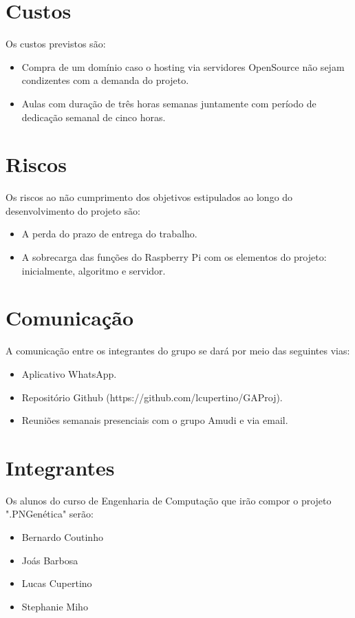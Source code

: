 \documentclass{article}
\begin{document}
	
	\section{Custos}
	Os custos previstos são:
	\begin{itemize}
		\item Compra de um domínio caso o hosting via servidores OpenSource não sejam condizentes com a demanda do projeto.
		\item Aulas com duração de três horas semanas juntamente com período de dedicação semanal de cinco horas.
	\end{itemize}

	
	
	\section{Riscos}
	Os riscos ao não cumprimento dos objetivos estipulados ao longo do desenvolvimento do projeto são: \newline
	\begin{itemize} 
		\item A perda do prazo de entrega do trabalho.
		\item A sobrecarga das funções do Raspberry Pi com os elementos do projeto: inicialmente, algoritmo e servidor.
	\end{itemize}

	\section{Comunicação}
	A comunicação entre os integrantes do grupo se dará por meio das seguintes vias:
	\begin{itemize}
		\item Aplicativo WhatsApp.
		\item Repositório Github (https://github.com/lcupertino/GAProj).
		\item Reuniões semanais presenciais com o grupo Amudi e via email.
	\end{itemize}
	
	\section{Integrantes}
	Os alunos do curso de Engenharia de Computação que irão compor o projeto ".PNGenética" serão:	
	\begin{itemize}
		\item Bernardo Coutinho
		\item Joás Barbosa
		\item Lucas Cupertino
		\item Stephanie Miho
	\end{itemize}
\end{document}
